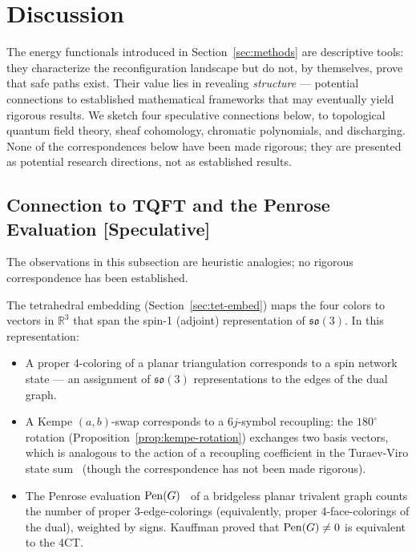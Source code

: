 
\section{Discussion}\label{sec:discussion}

The energy functionals introduced in Section~\ref{sec:methods} are
descriptive tools: they characterize the reconfiguration landscape but
do not, by themselves, prove that safe paths exist. Their value lies
in revealing \emph{structure} — potential connections to established
mathematical frameworks that may eventually yield rigorous results.
We sketch four speculative connections below, to topological quantum
field theory, sheaf cohomology, chromatic polynomials, and discharging.
None of the correspondences below have been made rigorous; they are
presented as potential research directions, not as established results.

\subsection{Connection to TQFT and the Penrose Evaluation
  {\normalfont\textmd{[Speculative]}}}
\label{sec:tqft}

The observations in this subsection are heuristic analogies; no
rigorous correspondence has been established.

The tetrahedral embedding (Section~\ref{sec:tet-embed}) maps the four
colors to vectors in $\mathbb{R}^3$ that span the spin-1
(adjoint) representation of $\mathfrak{so}(3)$. In this representation:

\begin{itemize}
  \item A proper 4-coloring of a planar triangulation corresponds to a
    spin network state — an assignment of $\mathfrak{so}(3)$
    representations to the edges of the dual graph.
  \item A Kempe $(a,b)$-swap corresponds to a $6j$-symbol recoupling:
    the $180^\circ$ rotation (Proposition~\ref{prop:kempe-rotation})
    exchanges two basis vectors, which is analogous to the action of a
    recoupling coefficient in the Turaev-Viro state
    sum~\cite{turaev1992} (though the correspondence has not been made
    rigorous).
  \item The Penrose evaluation $\operatorname{Pen}(G)$~\cite{kauffman1990} of a
    bridgeless planar trivalent graph counts the number of proper
    3-edge-colorings (equivalently, proper 4-face-colorings of the
    dual), weighted by signs. Kauffman proved that $\operatorname{Pen}(G) \neq 0$
    is equivalent to the 4CT.
\end{itemize}

